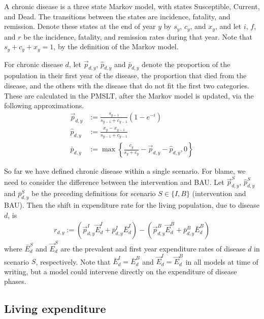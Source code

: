 \documentclass[]{article}
\begin{document}
A chronic disease is a three state Markov model, with states Susceptible, Current, and Dead. The transitions between the states are incidence, fatality, and remission. Denote these states at the end of year $y$ by $s_y$, $c_y$, and $x_y$, and let $i$, $f$, and $r$ be the incidence, fatality, and remission rates during that year. Note that $s_y + c_y + x_y = 1$, by the definition of the Markov model.

For chronic disease $d$, let $\vec{p}_{d, y}$, $\widehat{p}_{d, y}$ and $\bar{p}_{d, y}$ denote the proportion of the population in their first year of the disease, the proportion that died from the disease, and the others with the disease that do not fit the first two categories. These are calculated in the PMSLT, after the Markov model is updated, via the following approximations.
\begin{align*}
	\vec{p}_{d, y} &:= \frac{s_{y - 1}}{s_{y - 1} + c_{y - 1}}(1 - e^{-i}) \\
	\widehat{p}_{d, y} &:= \frac{x_y - x_{y - 1}}{s_{y - 1} + c_{y - 1}} \\
	\bar{p}_{d, y} &:= \max\left\{\frac{c_y}{s_y + c_y} - \vec{p}_{d, y} - \widehat{p}_{d, y}, 0 \right\}
\end{align*}

So far we have defined chronic disease within a single scenario. For blame, we need to consider the difference between the intervention and BAU. Let $\vec{p}^S_{d, y}$, $\widehat{p}^S_{d, y}$ and $\bar{p}^S_{d, y}$ be the preceding definitions for scenario $S \in \{I, B\}$ (intervention and BAU). Then the shift in expenditure rate for the living population, due to disease $d$, is
\begin{align*}
	r_{d, y} := 
	\left(\vec{p}^I_{d, y}\vec{E}^I_{d} + \bar{p}^I_{d, y}\bar{E}^I_{d}\right) - \left(\vec{p}^B_{d, y}\vec{E}^B_{d} + \bar{p}^B_{d, y}\bar{E}^B_{d}\right)
\end{align*}
where $\bar{E}^S_d$ and $\vec{E}^S_d$ are the prevalent and first year expenditure rates of disease $d$ in scenario $S$, respectively. Note that $\bar{E}^I_d = \bar{E}^B_d$ and $\vec{E}^I_d = \vec{E}^B_d$ in all models at time of writing, but a model could intervene directly on the expenditure of disease phases.

\subsection{Living expenditure}
\end{document}
